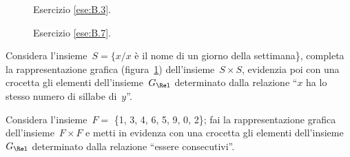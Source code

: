 \begin{inaccessibleblock}
 \begin{figure}[t]
\begin{minipage}[b]{.45\textwidth}
 \centering
 
 \caption{Esercizio \ref{ese:B.3}.}\label{fig:B.11}
\end{minipage}\hfil
\begin{minipage}[b]{.45\textwidth}
 \centering
 
 \caption{Esercizio \ref{ese:B.7}.}\label{fig:B.12}
\end{minipage}
\end{figure}
\end{inaccessibleblock}


\begin{multicols}{2}
\begin{esercizio}
\label{ese:B.7}
Considera l'insieme~$S = \{ x / x$ è il nome di un giorno della settimana\}, 
completa la rappresentazione grafica (figura~\ref{fig:B.12}) 
dell'insieme~$S \times S$, evidenzia poi con una crocetta gli elementi 
dell'insieme~$G_\Rel$ determinato dalla relazione ``$x$ ha lo stesso numero di 
sillabe di~$y$''.
\end{esercizio}

\begin{esercizio}
\label{ese:B.8}
Considera l'insieme~$F =$ \{1, 3, 4, 6, 5, 9, 0, 2\}; fai la rappresentazione 
grafica dell'insieme~$F \times F$ e metti in evidenza con una crocetta gli
elementi dell'insieme~$G_\Rel$ determinato dalla relazione ``essere 
consecutivi''.
\end{esercizio}
\end{multicols}



